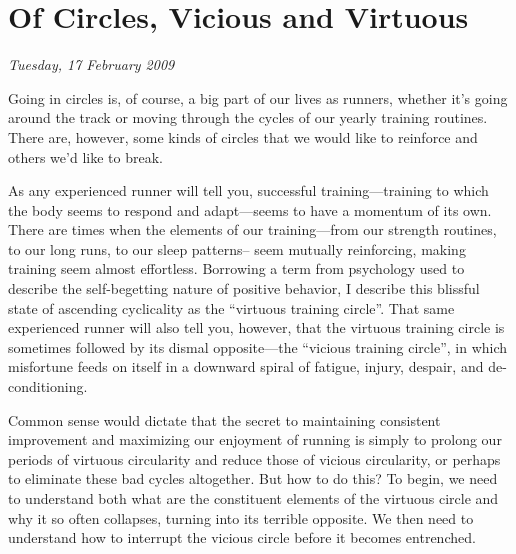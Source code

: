 \chapter{Of Circles, Vicious and Virtuous}
\textit{Tuesday, 17 February 2009}
\bigskip

Going in circles is, of course, a big part of our lives as runners, whether it’s going around the track or moving through the cycles of our yearly training routines. There are, however, some kinds of circles that we would like to reinforce and others we’d like to break.

As any experienced runner will tell you, successful training—training to which the body seems to respond and adapt—seems to have a momentum of its own. There are times when the elements of our training—from our strength routines, to our long runs, to our sleep patterns-- seem mutually reinforcing, making training seem almost effortless. Borrowing a term from psychology used to describe the self-begetting nature of positive behavior, I describe this blissful state of ascending cyclicality as the “virtuous training circle”. That same experienced runner will also tell you, however, that the virtuous training circle is sometimes followed by its dismal opposite—the “vicious training circle”, in which misfortune feeds on itself in a downward spiral of fatigue, injury, despair, and de-conditioning.

Common sense would dictate that the secret to maintaining consistent improvement and maximizing our enjoyment of running is simply to prolong our periods of virtuous circularity and reduce those of vicious circularity, or perhaps to eliminate these bad cycles altogether. But how to do this? To begin, we need to understand both what are the constituent elements of the virtuous circle and why it so often collapses, turning into its terrible opposite. We then need to understand how to interrupt the vicious circle before it becomes entrenched.

